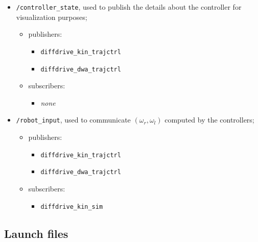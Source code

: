 \documentclass[11pt,a4paper]{article}
\begin{document}
\begin{itemize}
    \item \texttt{/controller\_state}, used to publish the details about the controller for visualization purposes;
        \begin{itemize}
            \item publishers:
                \begin{itemize}
                    \item \texttt{diffdrive\_kin\_trajctrl}
                    \item \texttt{diffdrive\_dwa\_trajctrl}
                \end{itemize}
            \item subscribers:
                \begin{itemize}
                    \item \textit{none}
                \end{itemize}
        \end{itemize}

    \item \texttt{/robot\_input}, used to communicate $(\omega_r,\omega_l)$ computed by the controllers;
        \begin{itemize}
            \item publishers:
                \begin{itemize}
                    \item \texttt{diffdrive\_kin\_trajctrl}
                    \item \texttt{diffdrive\_dwa\_trajctrl}
                \end{itemize}
            \item subscribers:
                \begin{itemize}
                    \item \texttt{diffdrive\_kin\_sim}
                \end{itemize}
        \end{itemize}

\end{itemize}



\subsection{Launch files}
\end{document}
